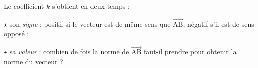 \documentclass[border=4pt]{standalone}
\newcommand{\V}[1]{\overrightarrow{\mathrm{#1}}}
\begin{document}
\begin{minipage}{8.5cm}\large \colorbox{orange!8}{\begin{minipage}{8.2cm}\par Le coefficient $k$ s'obtient en deux temps :\par $\star$ son \textit{signe} : positif si le vecteur est de même sens que $\V{AB}$, négatif s'il est de sens opposé ;\par $\star$ sa \textit{valeur} : combien de fois la norme de $\V{AB}$ faut-il prendre pour obtenir la norme du vecteur ?\vspace{4pt}\end{minipage}}\end{minipage}
\end{document}
